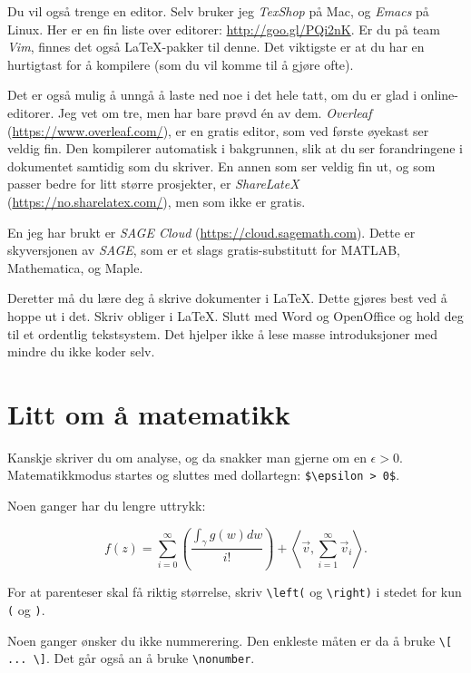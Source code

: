 \documentclass[a4paper, norsk]{article}  %
\begin{document}
Du vil også trenge en editor. Selv bruker jeg \emph{TexShop} på Mac, og \emph{Emacs} på Linux. Her er en fin liste over editorer: \url{http://goo.gl/PQi2nK}. Er du på team \emph{Vim}, finnes det også \LaTeX-pakker til denne. Det viktigste er at du har en hurtigtast for å kompilere (som du vil komme til å gjøre ofte).

Det er også mulig å unngå å laste ned noe i det hele tatt, om du er glad i online-editorer. Jeg vet om tre, men har bare prøvd én av dem. \emph{Overleaf} (\url{https://www.overleaf.com/}), er en gratis editor, som ved første øyekast ser veldig fin. Den kompilerer automatisk i bakgrunnen, slik at du ser forandringene i dokumentet samtidig som du skriver. En annen som ser veldig fin ut, og som passer bedre for litt større prosjekter, er \emph{ShareLateX} (\url{https://no.sharelatex.com/}), men som ikke er gratis. 

En jeg har brukt er \emph{SAGE Cloud} (\url{https://cloud.sagemath.com}). Dette er skyversjonen av \emph{SAGE}, som er et slags gratis-substitutt for MATLAB, Mathematica, og Maple.

Deretter må du lære deg å skrive dokumenter i \LaTeX. Dette gjøres best ved å hoppe ut i det. Skriv obliger i \LaTeX. Slutt med Word og OpenOffice og hold deg til et ordentlig tekstsystem. Det hjelper ikke å lese masse introduksjoner med mindre du ikke koder selv.

\section{Litt om å matematikk}
\label{seksjonmatte}

Kanskje skriver du om analyse, og da snakker man gjerne om en $\epsilon > 0 $. Matematikkmodus startes og sluttes med dollartegn: \verb|$\epsilon > 0$|. 

Noen ganger har du lengre uttrykk:

\begin{equation}
f(z) = \sum_{i=0}^\infty \left( 
\frac{\int_\gamma g(w) dw}{i!}
\right) + \left\langle \vec v, \sum_{i=1}^\infty \vec v_i \right\rangle.
\end{equation}

For at parenteser skal få riktig størrelse, skriv \verb|\left(| og \verb|\right)| i stedet for kun \texttt{(} og \texttt{)}.

Noen ganger ønsker du ikke nummerering. Den enkleste måten er da å bruke \verb|\[ ... \]|. Det går også an å bruke \verb|\nonumber|. 
\end{document}
